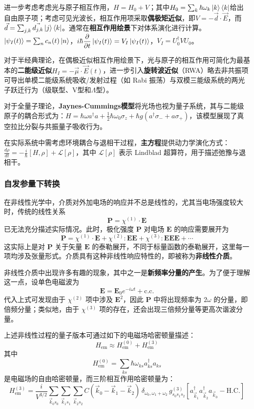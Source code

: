 \begin{enumerate}
	进一步考虑考虑光与原子相互作用，$H = H_0 + V$；其中$H_0 = \sum_{k}\hbar\omega_k\ket{k}\bra{k}$给出自由原子项；考虑可见光波长，相互作用项采取\textbf{偶极矩近似}，即$V = -\vec{d}\cdot\vec{E}$，而$\vec{d} = \sum_{j,k}\vec{d_{j,k}}\ket{j}\bra{k}$。通常在\textbf{相互作用绘景}下对体系演化进行计算。$\ket{\psi_I(t)} = \sum_nc_n(t)\ket{n}$，$i\hbar\dfrac{\partial}{\partial t}\ket{\psi_I(t)} = V_I\ket{\psi_I(t)}$，$V_I = U_0^\dagger V U_0$。
	
	对于半经典理论，在偶极近似相互作用绘景下，光与原子的相互作用可简化为最基本的\textbf{二能级近似}$ H_I = -\vec{\mu} \cdot \vec{E}(t) $，进一步引入\textbf{旋转波近似}（RWA）略去非共振项可导出单模二能级系统吸收/发射过程（如 Rabi 振荡）与双模三能级系统的两光子跃迁行为（级联型、V型和$\Lambda$型）。
	
	对于全量子理论，\textbf{Jaynes-Cummings模型}将光场也视为量子系统，其与二能级原子的耦合形式为：$ H = \hbar \omega a^\dagger a + \frac{1}{2}\hbar \omega_0 \sigma_z + \hbar g (a^\dagger \sigma_- + a \sigma_+) $，该模型展现了真空拉比分裂与共振量子吸收行为。
	
	在实际系统中需考虑环境耦合与退相干过程，\textbf{主方程}提供动力学演化方式：$ \frac{d\rho}{dt} = -\frac{i}{\hbar}[H,\rho] + \mathcal{L}[\rho] $，其中 \(\mathcal{L}[\rho]\) 表示 Lindblad 超算符，用于描述弛豫与退相干。
\end{enumerate}

\subsubsection{自发参量下转换}
在非线性光学中，介质对外加电场的响应并不总是线性的，尤其当电场强度较大时，传统的线性关系
\[
\mathbf{P} = \chi^{(1)} \cdot \mathbf{E}
\]
已无法充分描述实际情况。此时，极化强度 $\mathbf{P}$ 对电场 $\mathbf{E}$ 的响应需要展开为
\[
\mathbf{P} = \chi^{(1)} \cdot \mathbf{E} + \chi^{(2)} : \mathbf{EE} + \chi^{(3)} : \mathbf{EEE} + \cdots
\]
这实际上是对 $\mathbf{P}$ 关于矢量 $\mathbf{E}$ 的泰勒展开，不同于标量函数的泰勒展开，这里每一项均涉及张量形式。介质具有这种非线性响应特性的，即被称为\textbf{非线性介质}。

非线性介质中出现许多有趣的现象，其中之一是\textbf{新频率分量的产生}。为了便于理解这一点，设单色电磁波为
\[
\mathbf{E} = \mathbf{E}_0 e^{-i \omega t} + \text{c.c.}
\]
代入上式可发现由于 $\chi^{(2)}$ 项中涉及 $\mathbf{E}^2$，因此 $\mathbf{P}$ 中将出现频率为 $2\omega$ 的分量，即倍频分量；类似地，由于 $\chi^{(3)}$ 项的存在，还会出现三倍频分量等更高次谐波分量。

上述非线性过程的量子版本可通过如下的电磁场哈密顿量描述：
\[
H_{\text{em}} \approx H_{\text{em}}^{(0)} + H_{\text{em}}^{(3)}
\]
其中
\[
H_{\text{em}}^{(0)} = \sum_{ks} \hbar \omega_{ks} a_{ks}^\dagger a_{ks}
\]
是电磁场的自由哈密顿量，而三阶相互作用哈密顿量为：
\[
H_{\text{em}}^{(3)} = \frac{i}{V^{3/2}} \sum_{\vec{k}_0 s_0} \sum_{\vec{k}_1 s_1} \sum_{\vec{k}_2 s_2} C(\vec{k}_0 - \vec{k}_1 - \vec{k}_2) \, \delta_{\omega_0, \omega_1 + \omega_2} \, g^{(3)}_{s_0 s_1 s_2} \left[ a_{\vec{k}_1}^\dagger a_{\vec{k}_2}^\dagger a_{\vec{k}_0} - \text{H.C.} \right]
\]

